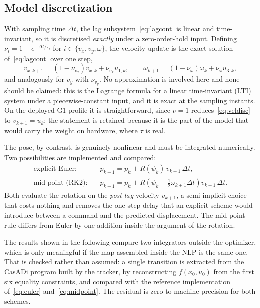 \documentclass[11pt,a4paper]{article}
\begin{document}
\subsection{Model discretization}
\label{sec:discretization}

With sampling time $\Delta t$, the lag subsystem~\eqref{eq:lagcont} is linear and time-invariant, so it is
discretised \emph{exactly} under a zero-order-hold input. Defining
$\nu_i = 1-e^{-\Delta t/\tau_i}$ for $i\in\{v_x,v_y,\omega\}$, the velocity update is the
exact solution of~\eqref{eq:lagcont} over one step,
\begin{equation}
  v_{x,k+1}=(1-\nu_{v_x})v_{x,k}+\nu_{v_x} u_{1,k},\qquad
  \omega_{k+1}=(1-\nu_\omega)\omega_{k}+\nu_\omega u_{3,k},
  \label{eq:veldisc}
\end{equation}
and analogously for $v_y$ with $\nu_{v_y}$. No approximation is involved here and none should be claimed: this is the Lagrange
formula for a linear time-invariant (LTI) system under a piecewise-constant input, and it is exact at the sampling instants. On the
deployed G1 profile it is straightforward, since $\nu=1$ reduces~\eqref{eq:veldisc} to
$v_{k+1}=u_k$; the statement is retained because it is the part of the model that would carry the weight on hardware, where $\tau$ is real.

The pose, by contrast, is genuinely nonlinear and must be integrated numerically. Two possibilities are implemented and compared:
\begin{align}
  \text{explicit Euler:}\quad & p_{k+1} = p_k + R(\psi_k)\,v_{k+1}\,\Delta t,
  \label{eq:euler}\\
  \text{mid-point (RK2):}\quad & p_{k+1} = p_k + R\!\left(\psi_k+\tfrac{1}{2}\omega_{k+1}\Delta t\right)v_{k+1}\,\Delta t.
  \label{eq:midpoint}
\end{align}
Both evaluate the rotation on the \emph{post-lag} velocity $v_{k+1}$, a semi-implicit choice that costs
nothing and removes the one-step delay that an explicit scheme would introduce between a command and the predicted
displacement. The mid-point rule differs from Euler by one addition inside the argument of the rotation.

The results shown in the following compare two integrators
outside the optimizer, which is only meaningful if the map assembled inside the NLP is the same one. That is
checked rather than assumed: a single transition is extracted from the CasADi program built by the tracker,
by reconstructing $f(x_0,u_0)$ from the first six equality constraints, and compared with the reference
implementation of~\eqref{eq:euler} and~\eqref{eq:midpoint}. The residual is zero to machine precision for both schemes.
\end{document}
